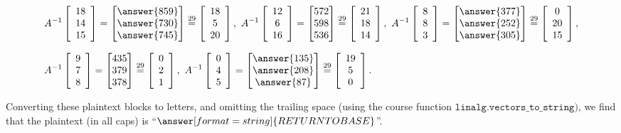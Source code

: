 \documentclass{ximera}
\begin{document}
\begin{solution}
  \begin{align*}
    &A^{-1} \startmat{c} 18 \\ 14 \\ 15 \stopmat
    = \begin{bmatrix}
      \answer{859} \\
      \answer{730} \\
      \answer{745}
      \end{bmatrix}\stackrel{29}{=}\startmat{c} 18 \\ 5 \\ 20 \stopmat,
    \quad
    A^{-1} \startmat{c} 12 \\ 6 \\ 16 \stopmat
    = \begin{bmatrix}
      572 \\
      598 \\
      536
      \end{bmatrix}\stackrel{29}{=}\startmat{c} 21 \\ 18 \\ 14 \stopmat,
    \quad
    A^{-1} \startmat{c} 8 \\ 8 \\ 3 \stopmat
    = \begin{bmatrix}
      \answer{377} \\
      \answer{252} \\
      \answer{305}
      \end{bmatrix}\stackrel{29}{=}\startmat{c} 0 \\ 20 \\ 15 \stopmat,
    \\\\[-2ex]
    &A^{-1} \startmat{c} 9 \\ 7 \\ 8 \stopmat
    = \begin{bmatrix}
      435 \\
      379 \\
      378
      \end{bmatrix}\stackrel{29}{=}\startmat{c} 0 \\ 2 \\ 1 \stopmat,
    \quad
    A^{-1} \startmat{c} 0 \\ 4 \\ 5 \stopmat
    = \begin{bmatrix}
      \answer{135} \\
      \answer{208} \\
      \answer{87}
      \end{bmatrix}\stackrel{29}{=}\startmat{c} 19 \\ 5 \\ 0 \stopmat.
  \end{align*}

  Converting these plaintext blocks to letters, and omitting the trailing space (using the course function $\texttt{linalg.vectors\_to\_string})$,
  we find that the plaintext (in all caps) is ``$\answer[format=string]{RETURN TO BASE}$''.
\end{solution}
\end{document}
